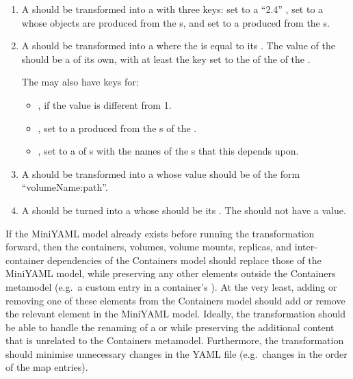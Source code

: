 \documentclass[twocolumn]{ceurart}
\begin{document}
\begin{enumerate}
\item A  should be transformed into a 
  with three keys:  set to a ``2.4'' ,
   set to a  whose  objects
  are produced from the s, and  set to a
   produced from the s.

\item A  should be transformed into a 
  where the  is equal to its . The value of the
   should be a  of its own, with at least the
   key set to the  of the  of the
  .

  The  may also have keys for:
  \begin{itemize}
  \item {}, if the value is different from 1.
  \item {}, set to a  produced from the
    s of the .
  \item {}, set to a  of s
    with the names of the s that this 
    depends upon.
  \end{itemize}

\item A  should be transformed into a 
  whose value should be of the form ``volumeName:path''.

\item A  should be turned into a  whose
   should be its . The  should
  not have a value.
\end{enumerate}

If the MiniYAML model already exists before running the transformation forward,
then the containers, volumes, volume mounts, replicas, and inter-container
dependencies of the Containers model should replace those of the MiniYAML model,
while preserving any other elements outside the Containers metamodel (e.g.\ a
custom  entry in a container's ). At the very
least, adding or removing one of these elements from the Containers model should
add or remove the relevant element in the MiniYAML model. Ideally, the
transformation should be able to handle the renaming of a 
or  while preserving the additional content that is unrelated
to the Containers metamodel. Furthermore, the transformation should minimise
unnecessary changes in the YAML file (e.g.\ changes in the order of the map
entries).
\end{document}

